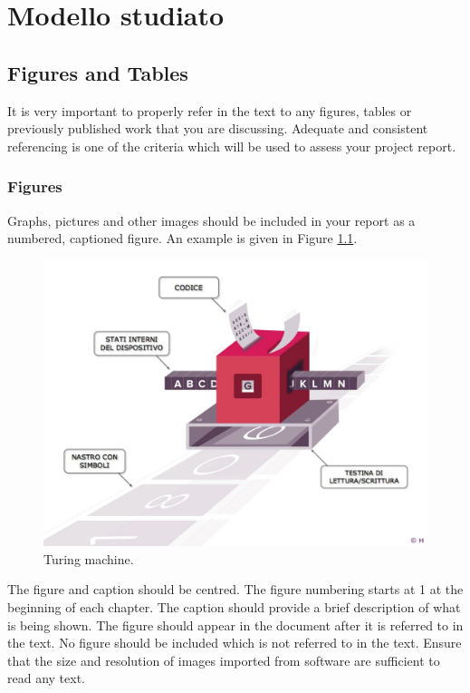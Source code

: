 \chapter{Modello studiato} \label{latexchapter}


\section{Figures and Tables}
It is very important to properly refer in the text to any figures, tables or previously published work that you are discussing. Adequate and consistent referencing is one of the criteria which will be used to assess your project report.

\subsection{Figures}
Graphs, pictures and other images should be included in your report as a numbered, captioned figure. An example is given in Figure \ref{veldis}.

\begin{figure}[h]
	\centering
	\includegraphics[width=\textwidth]{images/Turing-machine}
	\caption{Turing machine.}
	\label{veldis}
\end{figure}

The figure and caption should be centred. The figure numbering starts at 1 at the beginning of each chapter. The caption should provide a brief description of what is being shown. The figure should appear in the document after it is referred to in the text. No figure should be included which is not referred to in the text. Ensure that the size and resolution of images imported from software are sufficient to read any text.

